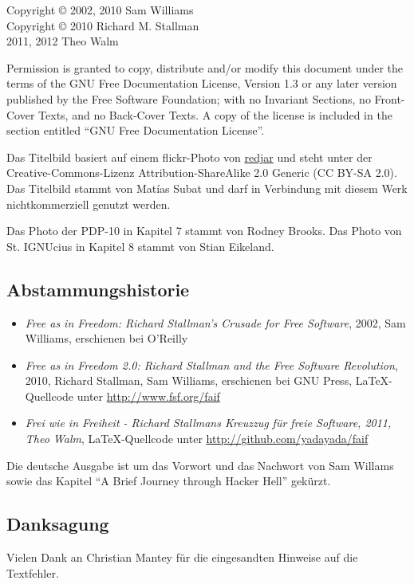 Copyright \copyright{} 2002, 2010 Sam Williams\\
Copyright \copyright{} 2010 Richard M. Stallman\\
2011, 2012 Theo Walm

Permission is granted to copy, distribute and/or modify
this document under the terms of the GNU Free Documentation License,
Version 1.3 or any later version published by the Free Software
Foundation; with no Invariant Sections, no Front-Cover Texts, and no
Back-Cover Texts. A copy of the license is included in the section
entitled "`GNU Free Documentation License"'.

\bigskip

\ifnum{}
	Das Titelbild basiert auf einem flickr-Photo von \href{http://www.flickr.com/photos/redjar/474652905/}{redjar} und steht unter der Creative-Commons-Lizenz Attribution-ShareAlike 2.0 Generic (CC BY-SA 2.0).
\else
Das Titelbild stammt von Matías Subat und darf in Verbindung mit diesem Werk nichtkommerziell genutzt werden.
\fi

Das Photo der PDP-10 in Kapitel 7 stammt von Rodney Brooks. Das Photo von St. IGNUcius in Kapitel 8 stammt von Stian Eikeland. 

\subsection*{Abstammungshistorie}
\begin{itemize}
\item
\textit{Free as in Freedom: Richard Stallman's Crusade for Free Software}, 2002, Sam Williams, erschienen bei O'Reilly

\item
\textit{Free as in Freedom 2.0: Richard Stallman and the Free Software Revolution}, 2010, Richard Stallman, Sam Williams, erschienen bei GNU Press, \LaTeX-Quellcode unter \url{http://www.fsf.org/faif}

\item
\textit{Frei wie in Freiheit - Richard Stallmans Kreuzzug für freie Software, 2011, Theo Walm}, \LaTeX-Quellcode unter \url{http://github.com/yadayada/faif}

\end{itemize}

Die deutsche Ausgabe ist um das Vorwort und das Nachwort von Sam Willams sowie das Kapitel "`A Brief Journey through Hacker Hell"' gekürzt.

\subsection*{Danksagung}

Vielen Dank an Christian Mantey für die eingesandten Hinweise auf die Textfehler.
